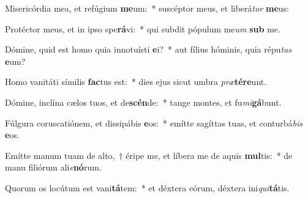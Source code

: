 \item Misericórdia mea, et refúgium \textbf{me}um:~* suscéptor meus, et liberá\textit{tor} \textbf{me}us:
\item Protéctor meus, et in ipso spe\textbf{rá}vi:~* qui subdit pópulum me\textit{um} \textbf{sub} me.
\item Dómine, quid est homo quia innotuísti \textbf{e}i?~* aut fílius hóminis, quia répu\textit{tas} \textbf{e}um?
\item Homo vanitáti símilis \textbf{fac}tus est:~* dies ejus sicut umbra \textit{præ}\textbf{tér}\textbf{e}unt.
\item Dómine, inclína cælos tuos, et de\textbf{scén}de:~* tange montes, et fu\textit{mi}\textbf{gá}bunt.
\item Fúlgura coruscatiónem, et dissipábis \textbf{e}os:~* emítte sagíttas tuas, et conturbá\textit{bis} \textbf{e}os.
\item Emítte manum tuam de alto,~† éripe me, et líbera me de aquis \textbf{mul}tis:~* de manu filiórum ali\textit{e}\textbf{nó}rum.
\item Quorum os locútum est vani\textbf{tá}tem:~* et déxtera eórum, déxtera ini\textit{qui}\textbf{tá}tis.

